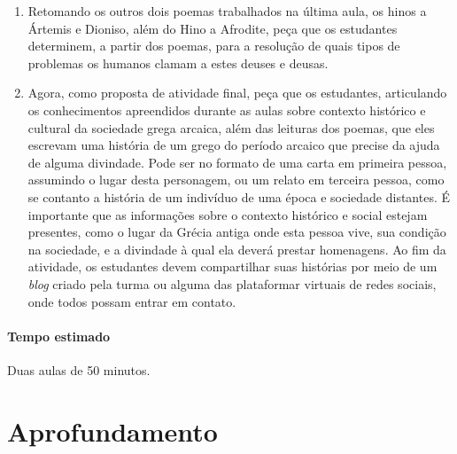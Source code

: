 \documentclass[12pt]{extarticle}
\begin{document}
\begin{enumerate}

	\item
	Retomando os outros dois poemas trabalhados na última aula, os hinos a 
	Ártemis e Dioniso, além do Hino a Afrodite, peça que os estudantes 
	determinem, a partir dos poemas, para a resolução de quais tipos de 
	problemas os humanos clamam a estes deuses e deusas. 

	\item
	Agora, como proposta de atividade final, peça que os estudantes, articulando
	os conhecimentos apreendidos durante as aulas sobre contexto histórico e cultural
	da sociedade grega arcaica, além das leituras dos poemas, que eles escrevam 
	uma história de um grego do período arcaico que precise da ajuda de alguma
	divindade. Pode ser no formato de uma carta em primeira pessoa, assumindo o lugar
	desta personagem, ou um relato em terceira pessoa, como se contanto a história
	de um indivíduo de uma época e sociedade distantes. É importante que as informações 
	sobre o contexto histórico e social estejam presentes, como o lugar da Grécia antiga 
	onde esta pessoa vive, sua condição na sociedade, e a divindade à qual ela deverá
	prestar homenagens. 
	Ao fim da atividade, os estudantes devem compartilhar suas histórias por meio de um
	\textit{blog} criado pela turma ou alguma das plataformar virtuais de redes sociais,
	onde todos possam entrar em contato.


\end{enumerate}

\paragraph{Tempo estimado} Duas aulas de 50 minutos.




\section{Aprofundamento}


\end{document}
